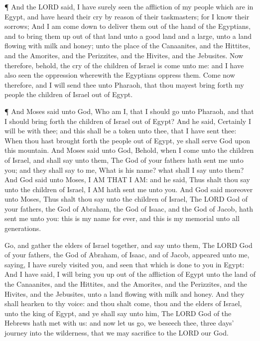  ¶ And the LORD said, I have surely seen the affliction of
my people which are in Egypt, and have heard their cry by reason of
their taskmasters; for I know their sorrows;  And I am come
down to deliver them out of the hand of the Egyptians, and to bring them
up out of that land unto a good land and a large, unto a land flowing
with milk and honey; unto the place of the Canaanites, and the Hittites,
and the Amorites, and the Perizzites, and the Hivites, and the
Jebusites.  Now therefore, behold, the cry of the children
of Israel is come unto me: and I have also seen the oppression wherewith
the Egyptians oppress them.  Come now therefore, and I will
send thee unto Pharaoh, that thou mayest bring forth my people the
children of Israel out of Egypt.

 ¶ And Moses said unto God, Who am I, that I should go unto
Pharaoh, and that I should bring forth the children of Israel out of
Egypt?  And he said, Certainly I will be with thee; and
this shall be a token unto thee, that I have sent thee: When thou hast
brought forth the people out of Egypt, ye shall serve God upon this
mountain.  And Moses said unto God, Behold, when I come
unto the children of Israel, and shall say unto them, The God of your
fathers hath sent me unto you; and they shall say to me, What is his
name? what shall I say unto them?  And God said unto Moses,
I AM THAT I AM: and he said, Thus shalt thou say unto the children of
Israel, I AM hath sent me unto you.  And God said moreover
unto Moses, Thus shalt thou say unto the children of Israel, The LORD
God of your fathers, the God of Abraham, the God of Isaac, and the God
of Jacob, hath sent me unto you: this is my name for ever, and this is
my memorial unto all generations.

 Go, and gather the elders of Israel together, and say unto
them, The LORD God of your fathers, the God of Abraham, of Isaac, and of
Jacob, appeared unto me, saying, I have surely visited you, and seen
that which is done to you in Egypt:  And I have said, I
will bring you up out of the affliction of Egypt unto the land of the
Canaanites, and the Hittites, and the Amorites, and the Perizzites, and
the Hivites, and the Jebusites, unto a land flowing with milk and honey.
 And they shall hearken to thy voice: and thou shalt come,
thou and the elders of Israel, unto the king of Egypt, and ye shall say
unto him, The LORD God of the Hebrews hath met with us: and now let us
go, we beseech thee, three days' journey into the wilderness, that we
may sacrifice to the LORD our God.

